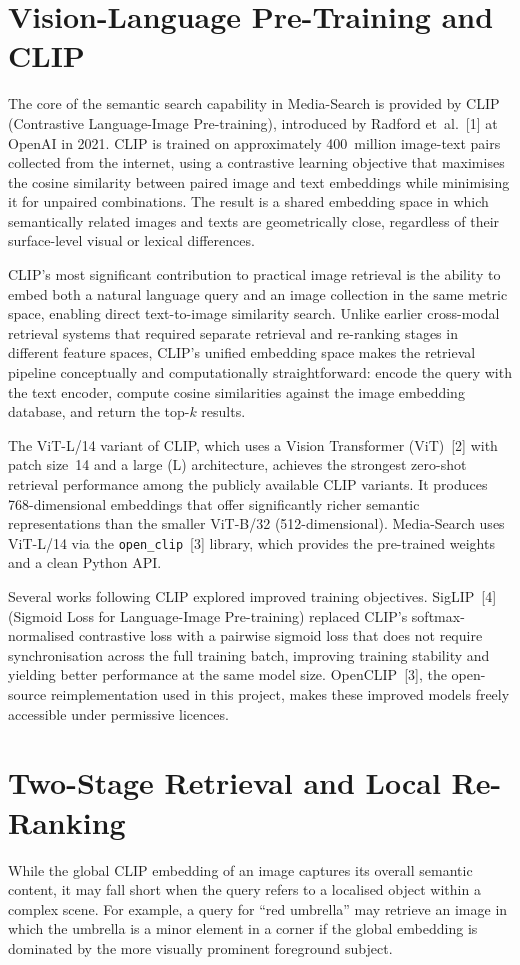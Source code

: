 \documentclass[12pt,a4paper,oneside]{report}
\begin{document}
\section{Vision-Language Pre-Training and CLIP}
The core of the semantic search capability in Media-Search is provided by
CLIP (Contrastive Language-Image Pre-training), introduced by Radford
et~al.~[1] at OpenAI in 2021. CLIP is trained on approximately 400~million
image-text pairs collected from the internet, using a contrastive learning
objective that maximises the cosine similarity between paired image and text
embeddings while minimising it for unpaired combinations. The result is a
shared embedding space in which semantically related images and texts are
geometrically close, regardless of their surface-level visual or lexical
differences.

CLIP's most significant contribution to practical image retrieval is the
ability to embed both a natural language query and an image collection in the
same metric space, enabling direct text-to-image similarity search. Unlike
earlier cross-modal retrieval systems that required separate retrieval and
re-ranking stages in different feature spaces, CLIP's unified embedding space
makes the retrieval pipeline conceptually and computationally straightforward:
encode the query with the text encoder, compute cosine similarities against
the image embedding database, and return the top-$k$ results.

The ViT-L/14 variant of CLIP, which uses a Vision Transformer (ViT)~[2] with
patch size~14 and a large (L) architecture, achieves the strongest zero-shot
retrieval performance among the publicly available CLIP variants. It produces
768-dimensional embeddings that offer significantly richer semantic
representations than the smaller ViT-B/32 (512-dimensional). Media-Search
uses ViT-L/14 via the \texttt{open\_clip}~[3] library, which provides the
pre-trained weights and a clean Python API.

Several works following CLIP explored improved training objectives.
SigLIP~[4] (Sigmoid Loss for Language-Image Pre-training) replaced CLIP's
softmax-normalised contrastive loss with a pairwise sigmoid loss that does
not require synchronisation across the full training batch, improving
training stability and yielding better performance at the same model size.
OpenCLIP~[3], the open-source reimplementation used in this project, makes
these improved models freely accessible under permissive licences.

\section{Two-Stage Retrieval and Local Re-Ranking}
While the global CLIP embedding of an image captures its overall semantic
content, it may fall short when the query refers to a localised object within
a complex scene.  For example, a query for ``red umbrella'' may retrieve an
image in which the umbrella is a minor element in a corner if the global
embedding is dominated by the more visually prominent foreground subject.
\end{document}
